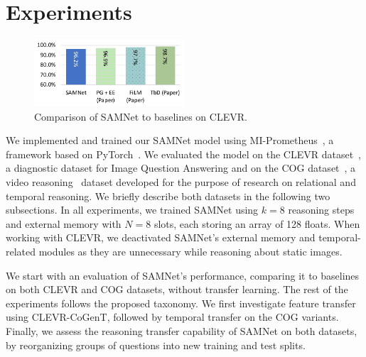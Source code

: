 \section{Experiments}
\label{sec:experiments}

\begin{figure}[b!]
	\centering
	\includegraphics[width=0.5\textwidth]{../img/plots/clevr_baselines.pdf}
	\caption{Comparison of SAMNet to baselines on CLEVR.}
	\label{fig:clevr_baselines}
\end{figure}


We implemented and trained our SAMNet model using MI-Prometheus~\cite{kornuta2018accelerating}, a framework based on PyTorch~\cite{paszke2017automatic}.
We evaluated the model on
the CLEVR dataset~\cite{johnson2017clevr}, a diagnostic dataset for Image Question Answering and on the COG dataset~\cite{yang2018dataset}, a video reasoning~\cite{mogadala2019trends} dataset developed for the purpose of research on relational and temporal reasoning.
We briefly describe both datasets in the following two subsections.
In all experiments, we trained SAMNet using $k = 8$ reasoning steps and external memory with $N = 8$ slots, each storing an array of 128 floats.
When working with CLEVR, we deactivated SAMNet's external memory and temporal-related modules as they are unnecessary while reasoning about static images.

We start with an evaluation of SAMNet's performance, comparing it to baselines on both CLEVR and COG datasets, without transfer learning.
The rest of the experiments follows the proposed taxonomy.
We first investigate feature transfer using CLEVR-CoGenT, followed by temporal transfer on the COG variants. Finally, we assess the reasoning transfer capability of SAMNet on both datasets, by reorganizing groups of questions into new training and test splits.

